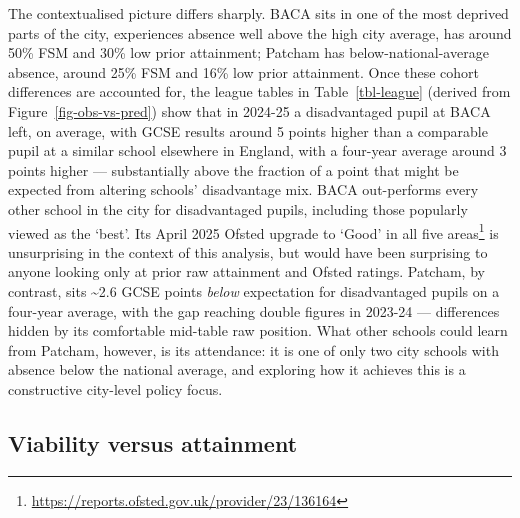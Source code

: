 \documentclass[
  12pt,
  titlepage]{article}
\begin{document}
The contextualised picture differs sharply. BACA sits in one of the most
deprived parts of the city, experiences absence well above the high city
average, has around 50\% FSM and 30\% low prior attainment; Patcham has
below-national-average absence, around 25\% FSM and 16\% low prior
attainment. Once these cohort differences are accounted for, the league
tables in Table~\ref{tbl-league} (derived from
Figure~\ref{fig-obs-vs-pred}) show that in 2024-25 a disadvantaged pupil
at BACA left, on average, with GCSE results around 5 points higher than
a comparable pupil at a similar school elsewhere in England, with a
four-year average around 3 points higher --- substantially above the
fraction of a point that might be expected from altering schools'
disadvantage mix. BACA out-performs every other school in the city for
disadvantaged pupils, including those popularly viewed as the `best'.
Its April 2025 Ofsted upgrade to `Good' in all five areas\footnote{\url{https://reports.ofsted.gov.uk/provider/23/136164}}
is unsurprising in the context of this analysis, but would have been
surprising to anyone looking only at prior raw attainment and Ofsted
ratings. Patcham, by contrast, sits \textasciitilde2.6 GCSE points
\emph{below} expectation for disadvantaged pupils on a four-year
average, with the gap reaching double figures in 2023-24 --- differences
hidden by its comfortable mid-table raw position. What other schools
could learn from Patcham, however, is its attendance: it is one of only
two city schools with absence below the national average, and exploring
how it achieves this is a constructive city-level policy focus.

\subsection{Viability versus
attainment}\label{viability-versus-attainment}
\end{document}
